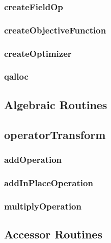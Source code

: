 \documentclass[10pt]{book}
\begin{document}
\subsubsection{\textbf{createFieldOp}}\label{subsec:createfieldop}


\subsubsection{\textbf{createObjectiveFunction}}\label{subsec:createobjfunc}


\subsubsection{\textbf{createOptimizer}}\label{subsec:createoptimizer}


\subsubsection{\textbf{qalloc}}\label{subsec:qalloc}



\subsection{Algebraic Routines}
\subsection{\textbf{operatorTransform}}\label{subsec:operatortransform}


\subsubsection{\textbf{addOperation}}\label{subsec:addop}


\subsubsection{\textbf{addInPlaceOperation}}\label{subsec:addinplaceop}


\subsubsection{\textbf{multiplyOperation}}\label{subsec:mulop}

 
 
\subsection{Accessor Routines}
\end{document}
